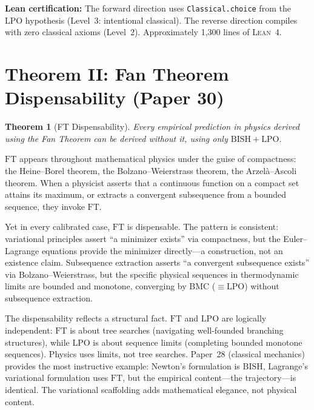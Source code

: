 \documentclass[11pt,a4paper]{report}
\theoremstyle{plain}
\newtheorem{theorem}{Theorem}[chapter]
\theoremstyle{definition}
\theoremstyle{remark}
\newcommand{\BISH}{\mathrm{BISH}}
\newcommand{\LPO}{\mathrm{LPO}}
\newcommand{\BMC}{\mathrm{BMC}}
\newcommand{\FT}{\mathrm{FT}}
\newcommand{\Lean}{\textsc{Lean~4}}
\begin{document}
\textbf{Lean certification:} The forward direction uses \texttt{Classical.choice} from the $\LPO$ hypothesis (Level~3: intentional classical). The reverse direction compiles with zero classical axioms (Level~2). Approximately 1{,}300 lines of \Lean.

\section{Theorem II: Fan Theorem Dispensability (Paper 30)}

\begin{theorem}[FT Dispensability]
Every empirical prediction in physics derived using the Fan Theorem can be derived without it, using only $\BISH+\LPO$.
\end{theorem}

$\FT$ appears throughout mathematical physics under the guise of compactness: the Heine--Borel theorem, the Bolzano--Weierstrass theorem, the Arzel\`a--Ascoli theorem. When a physicist asserts that a continuous function on a compact set attains its maximum, or extracts a convergent subsequence from a bounded sequence, they invoke $\FT$.

Yet in every calibrated case, $\FT$ is dispensable. The pattern is consistent: variational principles assert ``a minimizer exists'' via compactness, but the Euler--Lagrange equations provide the minimizer directly---a construction, not an existence claim. Subsequence extraction asserts ``a convergent subsequence exists'' via Bolzano--Weierstrass, but the specific physical sequences in thermodynamic limits are bounded and monotone, converging by $\BMC$ ($\equiv \LPO$) without subsequence extraction.

The dispensability reflects a structural fact. $\FT$ and $\LPO$ are logically independent: $\FT$ is about tree searches (navigating well-founded branching structures), while $\LPO$ is about sequence limits (completing bounded monotone sequences). Physics uses limits, not tree searches. Paper~28 (classical mechanics) provides the most instructive example: Newton's formulation is $\BISH$, Lagrange's variational formulation uses $\FT$, but the empirical content---the trajectory---is identical. The variational scaffolding adds mathematical elegance, not physical content.
\end{document}
